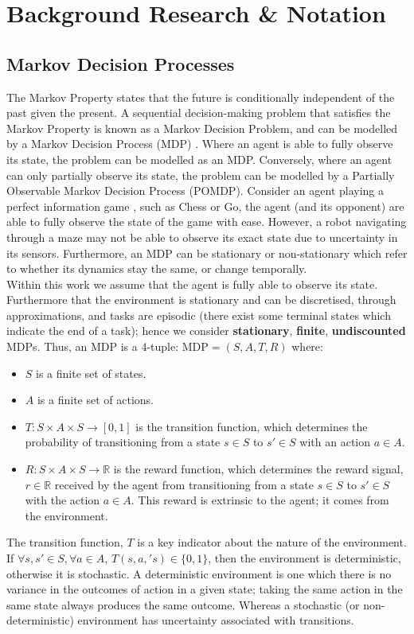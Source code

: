 \chapter{Background Research \& Notation}
\label{chapter2}
\section{Markov Decision Processes}
The Markov Property states that the future is conditionally independent of the past given the present. A sequential decision-making problem that satisfies the Markov Property is known as a Markov Decision Problem, and can be modelled by a Markov Decision Process (MDP) \citep{10.5555/528623}. Where an agent is able to fully observe its state, the problem can be modelled as an MDP. Conversely, where an agent can only partially observe its state, the problem can be modelled by a Partially Observable Markov Decision Process (POMDP).
Consider an agent playing a perfect information game \cite{vonneumann.morgenstern47}, such as Chess or Go, the agent (and its opponent) are able to fully observe the state of the game with ease. However, a robot navigating through a maze may not be able to observe its exact state due to uncertainty in its sensors.
Furthermore, an MDP can be stationary or non-stationary which refer to whether its dynamics stay the same, or change temporally.
\\Within this work we assume that the agent is fully able to observe its state. Furthermore that the environment is stationary and can be discretised, through approximations, and tasks are episodic (there exist some terminal states which indicate the end of a task); hence we consider \textbf{stationary}, \textbf{finite}, \textbf{undiscounted} MDPs.
Thus, an MDP is a 4-tuple: $\text{MDP} = (S,A,T,R)$ where:
\begin{itemize}
    \item $S$ is a finite set of states.
    \item $A$ is a finite set of actions.
    \item $T : S \times A \times S \rightarrow [0,1]$ is the transition function, which determines the probability of transitioning from a state $s \in S$ to $s' \in S$ with an action $a \in A$.
    \item $R:S \times A \times S \rightarrow \mathbb{R}$ is the reward function, which determines the reward signal, $r \in \mathbb{R}$ received by the agent from transitioning from a state $s \in S$ to $s' \in S$ with the action $a \in A$. This reward is extrinsic to the agent; it comes from the environment.
\end{itemize}
The transition function, $T$ is a key indicator about the nature of the environment.
If $\forall s,s' \in S, \forall a \in A$, $T(s,a,'s) \in \{0,1\}$, then the environment is deterministic, otherwise it is stochastic.
A deterministic environment is one which there is no variance in the outcomes of action in a given state; taking the same action in the same state always produces the same outcome. Whereas a stochastic (or non-deterministic) environment has uncertainty associated with transitions.
